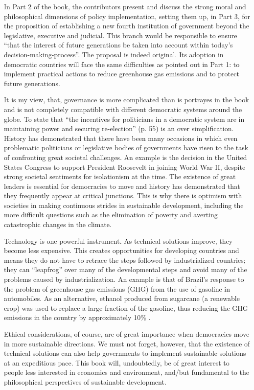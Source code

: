 \documentclass[10pt,a4paper]{article}
\begin{document}
\begin{multicols}{2}
In Part 2 of the book, the contributors present and discuss the strong moral and philosophical dimensions of policy implementation, setting them up, in Part 3, for the proposition of establishing a new fourth institution of government beyond the legislative, executive and judicial. This branch would be responsible to ensure ``that the interest of future generations be taken into account within today's decision-making-process''. The proposal is indeed original. Its adoption in democratic countries will face the same difficulties as pointed out in Part 1: to implement practical actions to reduce greenhouse gas emissions and to protect future generations.

It is my view, that, governance is more complicated than is portrayes in the book and is not completely compatible with different democratic systems around the globe. To state that ``the incentives for politicians in a democratic system are in maintaining power and securing re-election'' (p. 55) is an over simplification. History has demonstrated that there have been many occasions in which even problematic politicians or legislative bodies of governments have risen to the task of confronting great societal challenges. An example is the decision in the United States Congress to support President Roosevelt in joining World War II, despite strong societal sentiments for isolationism at the time. The existence of great leaders is essential for democracies to move and history has demonstrated that they frequently appear at critical junctions. This is why there is optimism with societies in making continuous strides in sustainable development, including the more difficult questions such as the elimination of poverty and averting catastrophic changes in the climate.

Technology is one powerful instrument. As technical solutions improve, they become less expensive. This creates opportunities for developing countries and means they do not have to retrace the steps followed by industrialized countries; they can “leapfrog” over many of the developmental steps and avoid many of the problems caused by industrialization. An example is that of Brazil’s response to the problem of greenhouse gas emissions (GHG) from the use of gasoline in automobiles.  As an alternative, ethanol produced from sugarcane (a renewable crop) was used to replace a large fraction of the gasoline, thus reducing the GHG emissions in the country by approximately 10\% \citep{r2}.

Ethical considerations, of course, are of great importance  when democracies move in more sustainable directions.  We must not forget, however, that the existence of technical solutions can also help governments to implement sustainable solutions at an expeditious pace. This book will, undoubtedly, be of great interest to people less interested in economics and environment, and/but fundamental to the philosophical perspectives of sustainable development.


\end{multicols}
\end{document}
